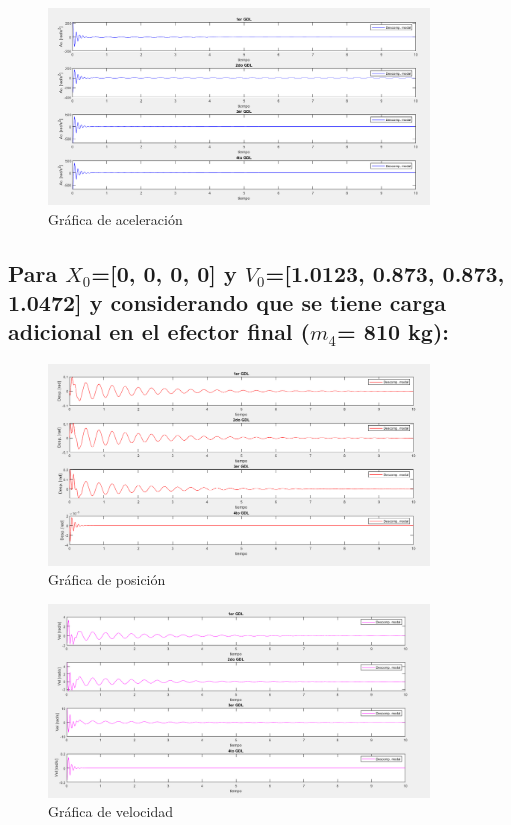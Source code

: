 \documentclass{aleph-revista}
\begin{document}
\begin{figure}[H]
    \centering
    \includegraphics[width=0.90\textwidth]{Imagenes/r27.png}
    \caption{Gráfica de aceleración}
    \label{fig:etiqueta de la figura}
\end{figure}


\subsection{ Para $X_0$=[0, 0, 0, 0] y $V_0$=[1.0123, 0.873, 0.873, 1.0472] y considerando que se tiene carga adicional en el efector final ($m_4$= 810 kg):}
\begin{figure}[H]
    \centering
    \includegraphics[width=0.90\textwidth]{Imagenes/r28.png}
    \caption{Gráfica de posición}
    \label{fig:etiqueta de la figura}
\end{figure}

\begin{figure}[H]
    \centering
    \includegraphics[width=0.90\textwidth]{Imagenes/r29.png}
    \caption{Gráfica de velocidad}
    \label{fig:etiqueta de la figura}
\end{figure}
\end{document}
